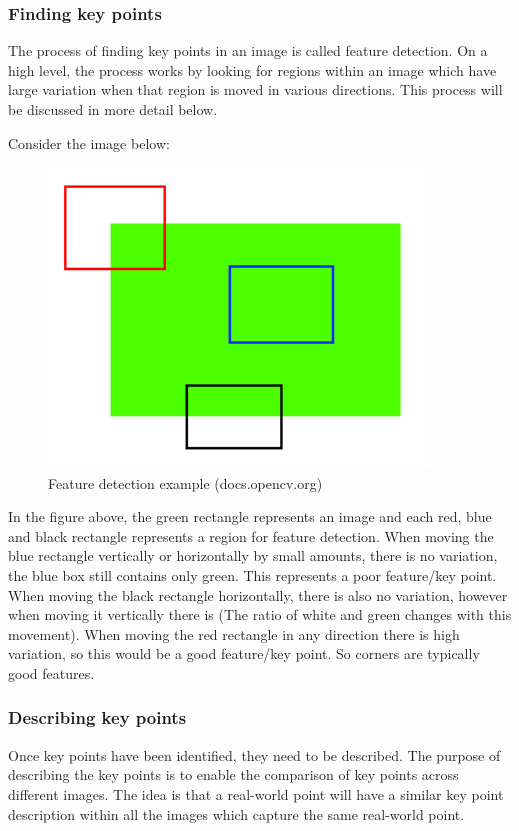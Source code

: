 \documentclass[11pt,a4paper]{report}
\begin{document}
			\subsubsection{Finding key points}
				The process of finding key points in an image is called feature detection. On a high level, the process works by looking for regions within an image which have large variation when that region is moved in various directions. This process will be discussed in more detail below.
				
				Consider the image below:
				
				\begin{figure}[H]
					\centering
					\includegraphics[width=0.9\textwidth]{feature_detection}
					\caption[Feature detection]{Feature detection example (docs.opencv.org)}
				\end{figure}
				
				In the figure above, the green rectangle represents an image and each red, blue and black rectangle represents a region for feature detection. When moving the blue rectangle vertically or horizontally by small amounts, there is no variation, the blue box still contains only green. This represents a poor feature/key point. 
				When moving the black rectangle horizontally, there is also no variation, however when moving it vertically there is (The ratio of white and green changes with this movement). When moving the red rectangle in any direction there is high variation, so this would be a good feature/key point. So corners are typically good features.
				
			\subsubsection{Describing key points}
				Once key points have been identified, they need to be described. The purpose of describing the key points is to enable the comparison of key points across different images. The idea is that a real-world point will have a similar key point description within all the images which capture the same real-world point.
				
\end{document}
